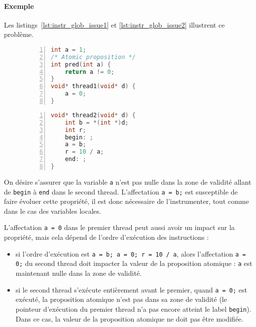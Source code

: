 \paragraph{Exemple}
Les listings~\ref{lst:instr_glob_issue1} et \ref{lst:instr_glob_issue2}
illustrent ce problème.

\begin{figure}
\noindent\begin{minipage}{.45\textwidth}
  \begin{lstlisting}[language=C, frame=single, numbers=left,
    caption=Thread 1, label=lst:instr_glob_issue1, xleftmargin=1.6em]
int a = 1;
/* Atomic proposition */
int pred(int a) {
    return a != 0;
}
void* thread1(void* d) {
    a = 0;
}
\end{lstlisting}
\end{minipage}\hfill
\begin{minipage}{.45\textwidth}
  \begin{lstlisting}[language=C, frame=single, numbers=left,
    caption=Thread 2, label=lst:instr_glob_issue2]
void* thread2(void* d) {
    int b = *(int *)d;
    int r;
    begin: ;
    a = b;
    r = 10 / a;
    end: ;
}
\end{lstlisting}
\end{minipage}
\end{figure}

On désire s'assurer que la variable \texttt{a} n'est pas nulle dans
la zone de validité allant de \texttt{begin} à \texttt{end} dans
le second thread. L'affectation \texttt{a = b;} est susceptible de
faire évoluer cette propriété, il est donc nécessaire de l'instrumenter,
tout comme dans le cas des variables locales.

L'affectation \texttt{a = 0} dans le premier thread peut aussi avoir
un impact sur la propriété, mais cela dépend de l'ordre d'exécution des
instructions :

\begin{itemize}
\item
  si l'ordre d'exécution est \texttt{a = b; a = 0; r = 10 / a}, alors
  l'affectation \texttt{a = 0;} du second thread doit impacter la
  valeur de la proposition atomique : \texttt{a} est maintenant nulle
  dans la zone de validité.
\item
  si le second thread s'exécute entièrement avant le premier, quand
  \texttt{a = 0;} est exécuté, la proposition atomique n'est pas dans
  sa zone de validité (le pointeur d'exécution du premier thread n'a pas
  encore atteint le label \texttt{begin}). Dans ce cas, la valeur de
  la proposition atomique ne doit pas être modifiée.
\end{itemize}

